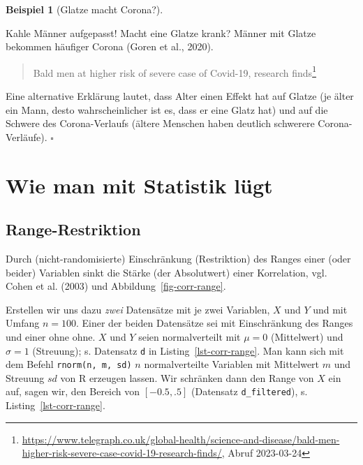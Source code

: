 \documentclass[
  letterpaper,
]{scrbook}
\theoremstyle{definition}
\newtheorem{example}{Beispiel}[chapter]
\theoremstyle{definition}
\theoremstyle{definition}
\theoremstyle{remark}
\begin{document}
\begin{example}[Glatze macht
Corona?]\protect\hypertarget{exm-corona-glatze}{}\label{exm-corona-glatze}

Kahle Männer aufgepasst! Macht eine Glatze krank? Männer mit Glatze
bekommen häufiger Corona (Goren et al., 2020).

\begin{quote}
Bald men at higher risk of severe case of Covid-19, research
finds\footnote{\url{https://www.telegraph.co.uk/global-health/science-and-disease/bald-men-higher-risk-severe-case-covid-19-research-finds/},
  Abruf 2023-03-24}
\end{quote}

Eine alternative Erklärung lautet, dass Alter einen Effekt hat auf
Glatze (je älter ein Mann, desto wahrscheinlicher ist es, dass er eine
Glatz hat) und auf die Schwere des Corona-Verlaufs (ältere Menschen
haben deutlich schwerere Corona-Verläufe). \(\square\)

\end{example}

\section{Wie man mit Statistik
lügt}\label{wie-man-mit-statistik-luxfcgt-3}

\subsection{Range-Restriktion}\label{range-restriktion}

Durch (nicht-randomisierte) Einschränkung (Restriktion) des Ranges einer
(oder beider) Variablen sinkt die Stärke (der Absolutwert) einer
Korrelation, vgl. Cohen et al. (2003) und
Abbildung~\ref{fig-corr-range}.

Erstellen wir uns dazu \emph{zwei} Datensätze mit je zwei Variablen,
\(X\) und \(Y\) und mit Umfang \(n=100\). Einer der beiden Datensätze
sei mit Einschränkung des Ranges und einer ohne ohne. \(X\) und \(Y\)
seien normalverteilt mit \(\mu=0\) (Mittelwert) und \(\sigma=1\)
(Streuung); s. Datensatz \texttt{d} in Listing~\ref{lst-corr-range}. Man
kann sich mit dem Befehl \texttt{rnorm(n,\ m,\ sd)} \(n\)
normalverteilte Variablen mit Mittelwert \(m\) und Streuung \(sd\) von R
erzeugen lassen. Wir schränken dann den Range von \(X\) ein auf, sagen
wir, den Bereich von \([-0.5, .5]\) (Datensatz \texttt{d\_filtered}), s.
Listing~\ref{lst-corr-range}.
\end{document}

